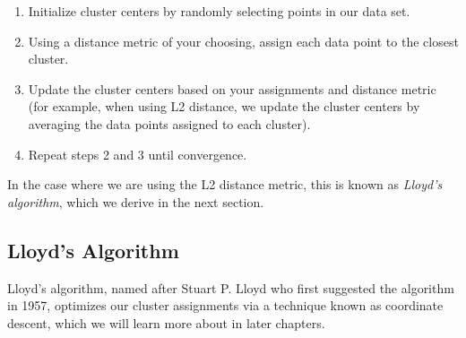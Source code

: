 \begin{enumerate}
    \item Initialize cluster centers by randomly selecting points in our data set.
    \item Using a distance metric of your choosing, assign each data point to the closest cluster.
    \item Update the cluster centers based on your assignments and distance metric (for example, when using L2 distance, we update the cluster centers by averaging the data points assigned to each cluster).
    \item Repeat steps 2 and 3 until convergence.
\end{enumerate}

In the case where we are using the L2 distance metric, this is known as \textit{Lloyd's algorithm}, which we derive in the next section.

\subsection{Lloyd's Algorithm}
Lloyd's algorithm, named after Stuart P. Lloyd who first suggested the algorithm in 1957, optimizes our cluster assignments via a technique known as coordinate descent, which we will learn more about in later chapters.

